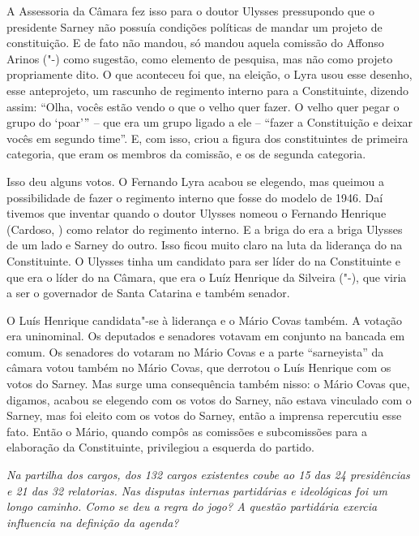 A Assessoria da Câmara fez isso para o doutor Ulysses pressupondo que o
presidente Sarney não possuía condições políticas de mandar um projeto
de constituição. E de fato não mandou, só mandou aquela comissão do
Affonso Arinos ("-) como sugestão, como elemento de pesquisa, mas
não como projeto propriamente dito. O que aconteceu foi que, na eleição,
o Lyra usou esse desenho, esse anteprojeto, um rascunho de regimento
interno para a Constituinte, dizendo assim: ``Olha, vocês estão vendo o
que o velho quer fazer. O velho quer pegar o grupo do `poar'$"$ -- que
era um grupo ligado a ele -- ``fazer a Constituição e deixar vocês em
segundo time''. E, com isso, criou a figura dos constituintes de
primeira categoria, que eram os membros da comissão, e os de segunda
categoria.

Isso deu alguns votos. O Fernando Lyra acabou se elegendo, mas queimou a
possibilidade de fazer o regimento interno que fosse do modelo de 1946.
Daí tivemos que inventar quando o doutor Ulysses nomeou o Fernando
Henrique (Cardoso, ) como relator do regimento interno. E a briga do
 era a briga Ulysses de um lado e Sarney do outro. Isso ficou muito
claro na luta da liderança do  na Constituinte. O Ulysses tinha um
candidato para ser líder do  na Constituinte e que era o líder do
 na Câmara, que era o Luíz Henrique da Silveira ("-), que viria
a ser o governador de Santa Catarina e também senador.

O Luís Henrique candidata"-se à liderança e o Mário Covas também. A
votação era uninominal. Os deputados e senadores votavam em conjunto na
bancada em comum. Os senadores do  votaram no Mário Covas e a parte
``sarneyista'' da câmara votou também no Mário Covas, que derrotou o
Luís Henrique com os votos do Sarney. Mas surge uma consequência também
nisso: o Mário Covas que, digamos, acabou se elegendo com os votos do
Sarney, não estava vinculado com o Sarney, mas foi eleito com os votos
do Sarney, então a imprensa repercutiu esse fato. Então o Mário, quando
compôs as comissões e subcomissões para a elaboração da Constituinte,
privilegiou a esquerda do partido.

\medskip

\noindent\emph{Na partilha dos cargos, dos 132 cargos existentes coube ao 
15 das 24 presidências e 21 das 32 relatorias. Nas disputas internas
partidárias e ideológicas foi um longo caminho. Como se deu a regra do
jogo? A questão partidária exercia influencia na definição da agenda?}

